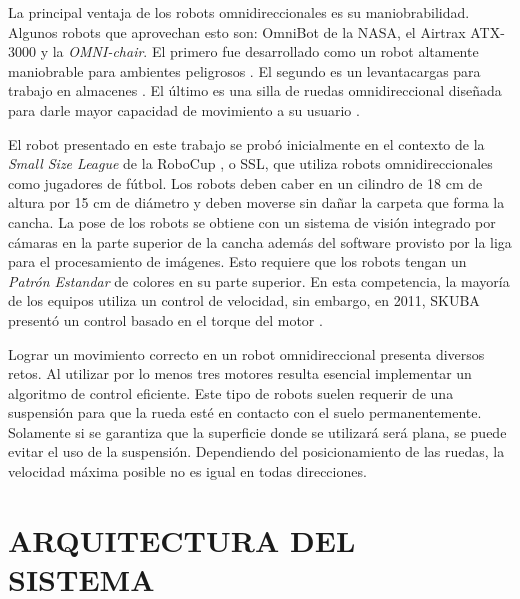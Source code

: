 \documentclass[twocolumn,10pt]{amrob}
\newcommand{\TODO}[1]{{\color{red}{ToDo: {#1}}}}
\begin{document}
La principal ventaja de los robots omnidireccionales es su maniobrabilidad. Algunos robots que aprovechan esto son: OmniBot de la NASA, el Airtrax ATX-3000 y la \textit{OMNI-chair}. El primero fue desarrollado como un robot altamente maniobrable para ambientes peligrosos \cite{houshangi1999omnibot}. El segundo es un levantacargas para trabajo en almacenes \cite{aduascualictei2011practical}. El último es una silla de ruedas omnidireccional diseñada para darle mayor capacidad de movimiento a su usuario \cite{borgolte1998architectural}.

El robot presentado en este trabajo se probó inicialmente en el contexto de la \emph{Small Size League} de la RoboCup \cite{sslWiki}, o SSL, que utiliza robots omnidireccionales como jugadores de fútbol. Los robots deben caber en un cilindro de 18 cm de altura por 15 cm de diámetro y deben moverse sin dañar la carpeta que forma la cancha. La pose de los robots se obtiene con un sistema de visión integrado por cámaras en la parte superior de la cancha además del software provisto por la liga para el procesamiento de imágenes. Esto requiere que los robots tengan un \textit{Patrón Estandar} de colores en su parte superior. En esta competencia, la mayoría de los equipos utiliza un control de velocidad, sin embargo, en 2011, SKUBA presentó un control basado en el torque del motor \cite{chaisoskuba}. 

Lograr un movimiento correcto en un robot omnidireccional presenta diversos retos. Al utilizar por lo menos tres motores resulta esencial implementar un algoritmo de control eficiente. Este tipo de robots suelen requerir de una suspensión para que la rueda esté en contacto con el suelo permanentemente. Solamente si se garantiza que la superficie donde se utilizará será plana, se puede evitar el uso de la suspensión. Dependiendo del posicionamiento de las ruedas, la velocidad máxima posible no es igual en todas direcciones. 



\section*{ARQUITECTURA DEL SISTEMA}
\end{document}
